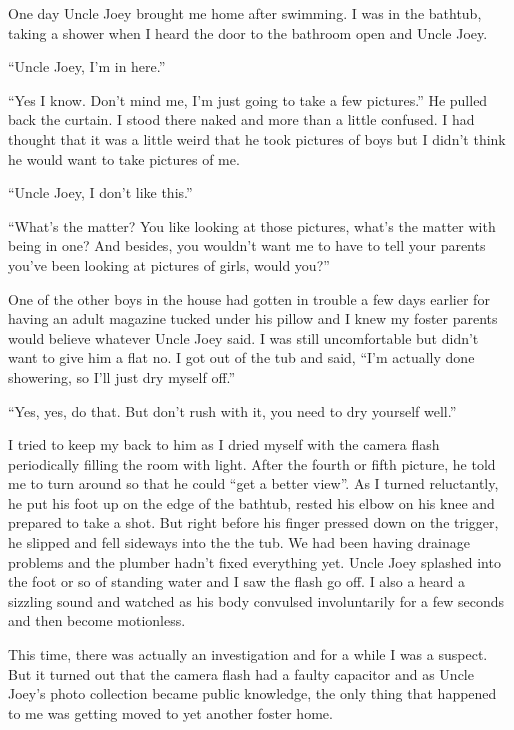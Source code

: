 \documentclass[12pt,letterpaper]{article}
\begin{document}
One day Uncle Joey brought me home after swimming. I was in the bathtub, taking a shower when I heard the door to the bathroom open and Uncle Joey.

``Uncle Joey, I'm in here.''

``Yes I know. Don't mind me, I'm just going to take a few pictures.'' He pulled back the curtain. I stood there naked and more than a little confused. I had thought that it was a little weird that he took pictures of boys but I didn't think he would want to take pictures of me.

``Uncle Joey, I don't like this.''

``What's the matter? You like looking at those pictures, what's the matter with being in one? And besides, you wouldn't want me to have to tell your parents you've been looking at pictures of girls, would  you?''

One of the other boys in the house had gotten in trouble a few days earlier for having an adult magazine tucked under his pillow and I knew my foster parents would believe whatever Uncle Joey said. I was still uncomfortable but didn't want to give him a flat no. I got out of the tub and said, ``I'm actually done showering, so I'll just dry myself off.''

``Yes, yes, do that. But don't rush with it, you need to dry yourself well.''

I tried to keep my back to him as I dried myself with the camera flash periodically filling the room with light. After the fourth or fifth picture, he told me to turn around so that he could ``get a better view''. As I turned reluctantly, he put his foot up on the edge of the bathtub, rested his elbow on his knee and prepared to take a shot. But right before his finger pressed down on the trigger, he slipped and fell sideways into the the tub. We had been having drainage problems and the plumber hadn't fixed everything yet. Uncle Joey splashed into the foot or so of standing water and I saw the flash go off. I also a heard a sizzling sound and watched as his body convulsed involuntarily for a few seconds and then become motionless.

This time, there was actually an investigation and for a while I was a suspect. But it turned out that the camera flash had a faulty capacitor and as Uncle Joey's photo collection became public knowledge, the only thing that happened to me was getting moved to yet another foster home.

\vspace{1in}
\end{document}

